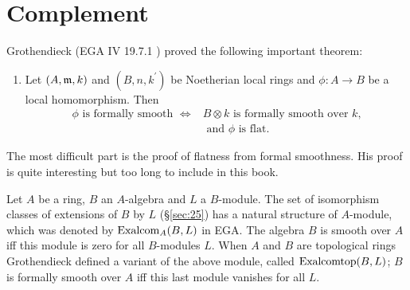 \documentclass[../main]{subfiles}
\begin{document}
\section{Complement}\label{sec:43}

Grothendieck (EGA IV 19.7.1 \cite{egaIV}) proved the following important theorem:
\begin{enumerate}[label=$(43.*)$]
    \item\label{thm:43.star} Let $(A, \mathfrak{m}, k)$ and $(B, n, k^{\prime})$ be Noetherian local rings and $\phi: A\longrightarrow B$ be a local homomorphism. Then
    \begin{align*}
        \phi\text{ is formally smooth }\iff& B \otimes k\text{ is formally smooth over }k\text{,}\\
        &\text{ and }\phi\text{ is flat}.
    \end{align*}
\end{enumerate}

The most difficult part is the proof of flatness from formal smoothness. His proof is quite interesting but too long to include in this book.

Let $A$ be a ring, $B$ an $A$-algebra and $L$ a $B$-module. The set of isomorphism classes of extensions of $B$ by $L$ (\S\ref{sec:25}) has a natural structure of $A$-module, which was denoted by $\operatorname{Exalcom}_A(B, L)$ in EGA. The algebra $B$ is smooth over $A$ iff this module is zero for all $B$-modules $L$. When $A$ and $B$ are topological rings Grothendieck defined a variant of the above module, called $\operatorname{Exalcomtop}(B, L)$; $B$ is formally smooth over $A$ iff this last module vanishes for all $L$.
\end{document}

